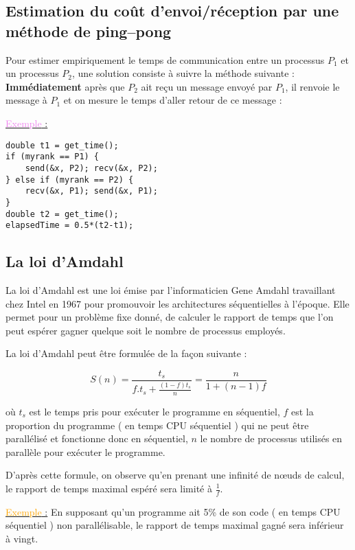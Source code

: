 \documentclass[fleqn,11pt]{article}
\begin{document}
\subsection{Estimation du coût d'envoi/réception par une méthode de ping--pong}

Pour estimer empiriquement le temps de communication entre un processus $P_{1}$ et un processus $P_{2}$,
une solution consiste à suivre la méthode suivante : \textbf{Immédiatement} après que $P_{2}$ ait reçu
un message envoyé par $P_{1}$, il renvoie le message à $P_{1}$ et on mesure le temps d'aller retour de ce
message :

\underline{\textcolor{violet}{Exemple} :}

\begin{lstlisting}
double t1 = get_time();
if (myrank == P1) {
    send(&x, P2); recv(&x, P2);
} else if (myrank == P2) {
    recv(&x, P1); send(&x, P1);
}
double t2 = get_time();
elapsedTime = 0.5*(t2-t1);
\end{lstlisting}

\subsection{La loi d'Amdahl}

La loi d'Amdahl est une loi émise par l'informaticien Gene Amdahl travaillant chez Intel en 1967 
pour promouvoir les architectures séquentielles à l'époque. Elle permet pour un problème fixe
donné, de calculer le rapport de temps que l'on peut espérer gagner quelque soit le nombre
de processus employés.

La loi d'Amdahl peut être formulée de la façon suivante :

\begin{equation}
 S(n) = \frac{t_{s}}{f.t_{s}+\frac{(1-f)t_{s}}{n}} = \frac{n}{1+(n-1)f}
\end{equation}

où $t_{s}$ est le temps pris pour exécuter le programme en séquentiel, $f$ est la proportion du programme
( en temps CPU séquentiel ) qui ne peut être parallélisé et fonctionne donc en séquentiel, $n$ le nombre de processus utilisés en
parallèle pour exécuter le programme.

D'après cette formule, on observe qu'en prenant une infinité de n{\oe}uds de calcul, le rapport de temps maximal
espéré sera limité à $\frac{1}{f}$.

\underline{\textcolor{orange}{Exemple} :} En supposant qu'un programme ait 5\% de son code ( en temps CPU
séquentiel ) non parallélisable, le rapport de temps maximal gagné sera inférieur à vingt.
\end{document}
